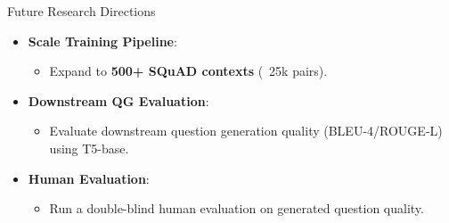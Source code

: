 \documentclass[aspectratio=169]{beamer}
\begin{document}
\begin{frame}{Future Research Directions}
    \begin{itemize}
        \item \textbf{Scale Training Pipeline}:
            \begin{itemize}
                \item Expand to \textbf{500+ SQuAD contexts} (~25k pairs).
            \end{itemize}
        \vspace{0.2cm}
        \item \textbf{Downstream QG Evaluation}:
            \begin{itemize}
                \item Evaluate downstream question generation quality (BLEU-4/ROUGE-L) using T5-base.
            \end{itemize}
        \vspace{0.2cm}
        \item \textbf{Human Evaluation}:
            \begin{itemize}
                \item Run a double-blind human evaluation on generated question quality.
            \end{itemize}
    \end{itemize}
\end{frame}
\end{document}
